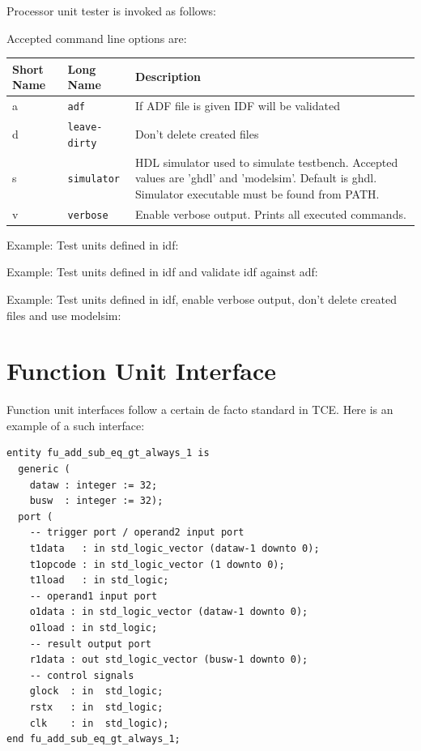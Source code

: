 \documentclass[twoside]{tceusermanual}
\begin{document}
Processor unit tester is invoked as follows:


Accepted command line options are:

\begin{center}
\begin{longtable}[htb]{@{}p{}@{}p{}%
                     @{}p{}}

\textbf{Short Name} &\textbf{Long Name} &\textbf{Description} \\
\hline

a & \verb|adf| &
If ADF file is given IDF will be validated \\

d & \verb|leave-dirty| &
Don't delete created files \\

s & \verb|simulator| &
HDL simulator used to simulate testbench. Accepted values are 'ghdl' and
'modelsim'. Default is ghdl. Simulator executable must be found from PATH. \\

v & \verb|verbose| &
Enable verbose output. Prints all executed commands. \\

\end{longtable}
\end{center}

Example: Test units defined in idf:


Example: Test units defined in idf and validate idf against adf:


Example: Test units defined in idf, enable verbose output, don't delete created
files and use modelsim:



\section{Function Unit Interface}

Function unit interfaces follow a certain de facto standard in TCE. Here is
an example of a such interface:

\begin{verbatim}
entity fu_add_sub_eq_gt_always_1 is
  generic (
    dataw : integer := 32;
    busw  : integer := 32);
  port (
    -- trigger port / operand2 input port
    t1data   : in std_logic_vector (dataw-1 downto 0);
    t1opcode : in std_logic_vector (1 downto 0);
    t1load   : in std_logic;
    -- operand1 input port
    o1data : in std_logic_vector (dataw-1 downto 0);
    o1load : in std_logic;
    -- result output port
    r1data : out std_logic_vector (busw-1 downto 0);
    -- control signals
    glock  : in  std_logic;
    rstx   : in  std_logic;
    clk    : in  std_logic);
end fu_add_sub_eq_gt_always_1;
\end{verbatim}
\end{document}
